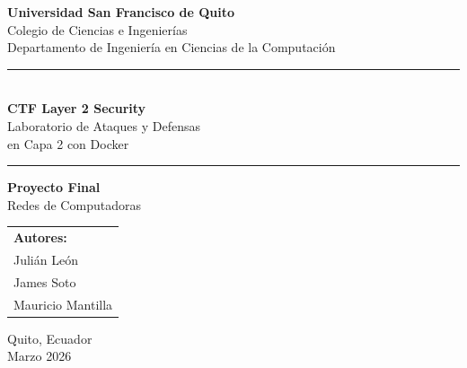 \documentclass[12pt, a4paper]{article}
\begin{document}
\begin{titlepage}
    \begin{center}
        \vspace*{1cm}


        \vspace{1cm}

        {\LARGE\bfseries\color{usfqblue} Universidad San Francisco de Quito}\\[0.3cm]
        {\Large Colegio de Ciencias e Ingenier\'ias}\\[0.2cm]
        {\large Departamento de Ingenier\'ia en Ciencias de la Computaci\'on}

        \vspace{1.5cm}

        \rule{\textwidth}{1.5pt}\\[0.4cm]
        {\Huge\bfseries\color{usfqblue} CTF Layer 2 Security}\\[0.3cm]
        {\LARGE Laboratorio de Ataques y Defensas\\en Capa 2 con Docker}\\[0.2cm]
        \rule{\textwidth}{1.5pt}

        \vspace{1cm}

        {\Large\bfseries Proyecto Final}\\[0.3cm]
        {\Large Redes de Computadoras}

        \vspace{1.5cm}

        {\large
        \begin{tabular}{l}
            \textbf{Autores:}\\[0.2cm]
            Juli\'an Le\'on\\
            James Soto\\
            Mauricio Mantilla\\
        \end{tabular}
        }

        \vfill

        {\large Quito, Ecuador}\\[0.2cm]
        {\large Marzo 2026}

    \end{center}
\end{titlepage}
\end{document}
